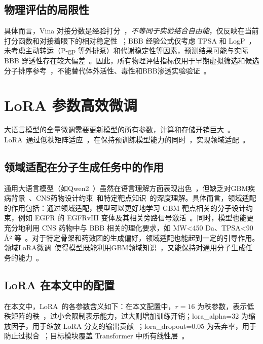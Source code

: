 \subsection{物理评估的局限性}

具体而言，Vina 对接分数是经验打分~\cite{Trott2010}，\textit{不等同于实验结合自由能}，仅反映在当前打分函数和对接着眼下的相对稳定性~\cite{Trott2010}；BBB 经验公式仅考虑 TPSA 和 LogP~\cite{Clark2000}，未考虑主动转运（P-gp 等外排泵）和代谢稳定性等因素，预测结果可能与实际 BBB 穿透性存在较大偏差~\cite{Pardridge2012}。因此，所有物理评估指标仅用于早期虚拟筛选和候选分子排序参考~\cite{Trott2010,Clark2000,Gao2023}，不能替代体外活性、毒性和BBB渗透实验验证~\cite{Trott2010,Pardridge2012}。

\section{LoRA 参数高效微调}\label{sec:lora-purpose}

大语言模型的全量微调需要更新模型的所有参数，计算和存储开销巨大~\cite{hu2022lora}。LoRA~\cite{hu2022lora}通过低秩矩阵适应~\cite{hu2022lora}，在保持预训练模型能力的同时~\cite{hu2022lora}，实现领域适配~\cite{hu2022lora}。

\subsection{领域适配在分子生成任务中的作用}

通用大语言模型（如Qwen2~\cite{Qwen2Team2024}）虽然在语言理解方面表现出色~\cite{Qwen2Team2024}，但缺乏对GBM疾病背景~\cite{Fu2025}、CNS药物设计约束~\cite{Pardridge2012}和特定靶点知识~\cite{Fu2025}的深度理解。具体而言，领域适配的作用包括：通过领域适配，模型可以更好地学习 GBM 靶点相关的分子设计约束，例如 EGFR 的 EGFRvIII 变体及其相关旁路信号激活~\cite{Fu2025}。同时，模型也能更充分地利用 CNS 药物中与 BBB 相关的理化要求，如 MW<450 Da、TPSA<90 Å² 等~\cite{Ertl2000,Pardridge2012}。对于特定骨架和药效团的生成偏好，领域适配也能起到一定的引导作用。
领域LoRA微调~\cite{hu2022lora}使得模型既能利用GBM领域知识~\cite{hu2022lora}，又能保持对通用分子生成任务的能力~\cite{hu2022lora}。

\subsection{LoRA 在本文中的配置}

在本文中，LoRA~\cite{hu2022lora}的各参数含义如下：在本文配置中，$r=16$ 为秩参数，表示低秩矩阵的秩~\cite{hu2022lora}，过小会限制表示能力，过大则增加训练开销；lora\_alpha=32 为缩放因子，用于缩放 LoRA 分支的输出贡献~\cite{hu2022lora}；lora\_dropout=0.05 为丢弃率，用于防止过拟合~\cite{hu2022lora}；目标模块覆盖 Transformer 中所有线性层~\cite{hu2022lora}。

